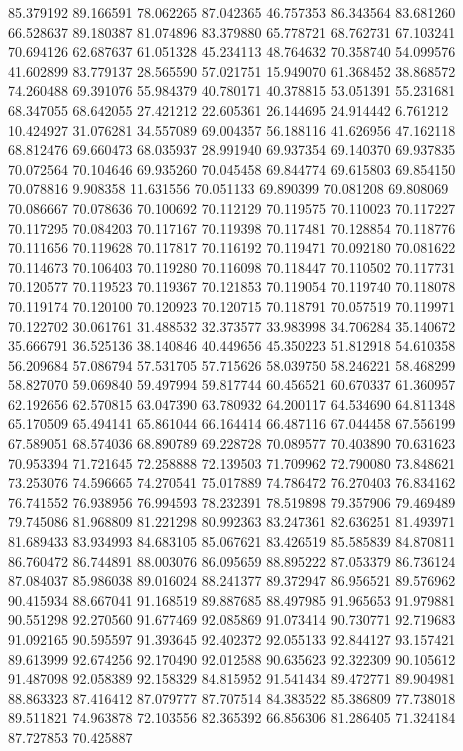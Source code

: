 85.379192
89.166591
78.062265
87.042365
46.757353
86.343564
83.681260
66.528637
89.180387
81.074896
83.379880
65.778721
68.762731
67.103241
70.694126
62.687637
61.051328
45.234113
48.764632
70.358740
54.099576
41.602899
83.779137
28.565590
57.021751
15.949070
61.368452
38.868572
74.260488
69.391076
55.984379
40.780171
40.378815
53.051391
55.231681
68.347055
68.642055
27.421212
22.605361
26.144695
24.914442
6.761212
10.424927
31.076281
34.557089
69.004357
56.188116
41.626956
47.162118
68.812476
69.660473
68.035937
28.991940
69.937354
69.140370
69.937835
70.072564
70.104646
69.935260
70.045458
69.844774
69.615803
69.854150
70.078816
9.908358
11.631556
70.051133
69.890399
70.081208
69.808069
70.086667
70.078636
70.100692
70.112129
70.119575
70.110023
70.117227
70.117295
70.084203
70.117167
70.119398
70.117481
70.128854
70.118776
70.111656
70.119628
70.117817
70.116192
70.119471
70.092180
70.081622
70.114673
70.106403
70.119280
70.116098
70.118447
70.110502
70.117731
70.120577
70.119523
70.119367
70.121853
70.119054
70.119740
70.118078
70.119174
70.120100
70.120923
70.120715
70.118791
70.057519
70.119971
70.122702
30.061761
31.488532
32.373577
33.983998
34.706284
35.140672
35.666791
36.525136
38.140846
40.449656
45.350223
51.812918
54.610358
56.209684
57.086794
57.531705
57.715626
58.039750
58.246221
58.468299
58.827070
59.069840
59.497994
59.817744
60.456521
60.670337
61.360957
62.192656
62.570815
63.047390
63.780932
64.200117
64.534690
64.811348
65.170509
65.494141
65.861044
66.164414
66.487116
67.044458
67.556199
67.589051
68.574036
68.890789
69.228728
70.089577
70.403890
70.631623
70.953394
71.721645
72.258888
72.139503
71.709962
72.790080
73.848621
73.253076
74.596665
74.270541
75.017889
74.786472
76.270403
76.834162
76.741552
76.938956
76.994593
78.232391
78.519898
79.357906
79.469489
79.745086
81.968809
81.221298
80.992363
83.247361
82.636251
81.493971
81.689433
83.934993
84.683105
85.067621
83.426519
85.585839
84.870811
86.760472
86.744891
88.003076
86.095659
88.895222
87.053379
86.736124
87.084037
85.986038
89.016024
88.241377
89.372947
86.956521
89.576962
90.415934
88.667041
91.168519
89.887685
88.497985
91.965653
91.979881
90.551298
92.270560
91.677469
92.085869
91.073414
90.730771
92.719683
91.092165
90.595597
91.393645
92.402372
92.055133
92.844127
93.157421
89.613999
92.674256
92.170490
92.012588
90.635623
92.322309
90.105612
91.487098
92.058389
92.158329
84.815952
91.541434
89.472771
89.904981
88.863323
87.416412
87.079777
87.707514
84.383522
85.386809
77.738018
89.511821
74.963878
72.103556
82.365392
66.856306
81.286405
71.324184
87.727853
70.425887
